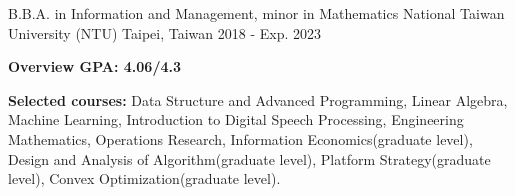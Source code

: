 

\begin{cventries}

  \cventry
    {B.B.A. in Information and Management, minor in Mathematics} %
    {National Taiwan University (NTU)} %
    {Taipei, Taiwan} %
    {2018 - Exp. 2023} %
    {
      \begin{cvitems} %
        \item {\textbf{Overview GPA: 4.06/4.3}}
        \item {\textbf{Selected courses:} Data Structure and Advanced Programming, Linear Algebra, Machine Learning, 
            Introduction to Digital Speech Processing, Engineering Mathematics, Operations Research, 
            Information Economics(graduate level), Design and Analysis of Algorithm(graduate level), 
            Platform Strategy(graduate level), Convex Optimization(graduate level).}
      \end{cvitems}
    }

\end{cventries}
